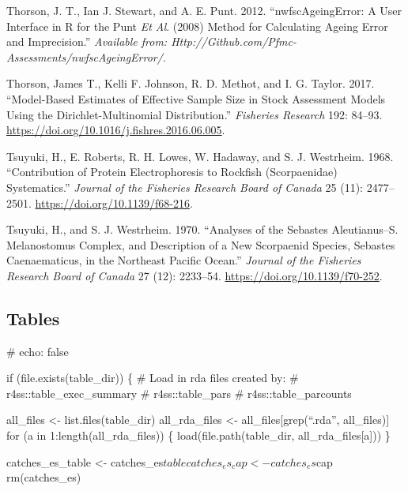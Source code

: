 \documentclass[
]{scrartcl}
\newlength{\cslhangindent}
\newenvironment{CSLReferences}[2] %
 {\begin{list}{}{%
  \setlength{\itemindent}{0pt}
  \setlength{\leftmargin}{0pt}
  \setlength{\parsep}{0pt}
  \ifodd #1
   \setlength{\leftmargin}{\cslhangindent}
   \setlength{\itemindent}{-1\cslhangindent}
  \fi
  \setlength{\itemsep}{#2\baselineskip}}}
 {\end{list}}
\begin{document}
\begin{CSLReferences}{1}{0}
Thorson, J. T., Ian J. Stewart, and A. E. Punt. 2012.
{``{nwfscAgeingError}: A User Interface in {R} for the {P}unt \emph{Et
Al}. (2008) Method for Calculating Ageing Error and Imprecision.''}
\emph{Available from:
Http://Github.com/Pfmc-Assessments/nwfscAgeingError/}.

Thorson, James T., Kelli F. Johnson, R. D. Methot, and I. G. Taylor.
2017. {``Model-Based Estimates of Effective Sample Size in Stock
Assessment Models Using the {Dirichlet}-Multinomial Distribution.''}
\emph{Fisheries Research} 192: 84--93.
\url{https://doi.org/10.1016/j.fishres.2016.06.005}.

Tsuyuki, H., E. Roberts, R. H. Lowes, W. Hadaway, and S. J. Westrheim.
1968. {``Contribution of {Protein} {Electrophoresis} to {Rockfish}
({Scorpaenidae}) {Systematics}.''} \emph{Journal of the Fisheries
Research Board of Canada} 25 (11): 2477--2501.
\url{https://doi.org/10.1139/f68-216}.

Tsuyuki, H., and S. J. Westrheim. 1970. {``Analyses of the {Sebastes}
Aleutianus--{S}. Melanostomus {Complex}, and {Description} of a New
{Scorpaenid} {Species}, {Sebastes} Caenaematicus, in the {Northeast}
{Pacific} {Ocean}.''} \emph{Journal of the Fisheries Research Board of
Canada} 27 (12): 2233--54. \url{https://doi.org/10.1139/f70-252}.

\end{CSLReferences}

\newpage{}

\subsection{Tables}\label{tables}

\#\textbar{} echo: false

if (file.exists(table\_dir)) \{ \# Load in rda files created by: \#
r4ss::table\_exec\_summary \# r4ss::table\_pars \#
r4ss::table\_parcounts

all\_files \textless- list.files(table\_dir) all\_rda\_files \textless-
all\_files{[}grep(``.rda'', all\_files){]} for (a in
1:length(all\_rda\_files)) \{ load(file.path(table\_dir,
all\_rda\_files{[}a{]})) \}

catches\_es\_table \textless- catches\_es\(table
  catches_es_cap <- catches_es\)cap rm(catches\_es)
\end{document}
